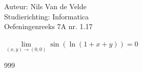 \documentclass[a4paper]{article}
\newcommand{\llim}{\lim\limits}
\begin{document}
  
\noindent \large Auteur: Nils Van de Velde \\
\noindent \large Studierichting: Informatica\\
\noindent \large Oefeningenreeks 7A nr. 1.17\\

\medskip

\normalsize

$\llim_{(x,y)\rightarrow(0,0)}\sin(\ln(1+x+y)) = 0$\\

\begin{thebibliography}{999}
\end{thebibliography}
\end{document}
